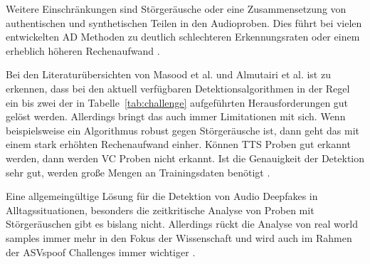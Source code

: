 Weitere Einschränkungen sind Störgeräusche oder eine Zusammensetzung von authentischen und synthetischen Teilen in den Audioproben.
Dies führt bei vielen entwickelten AD Methoden zu deutlich schlechteren Erkennungsraten oder einem erheblich höheren Rechenaufwand \citep[][]{Masood2022}.

Bei den Literaturübersichten von Masood et al. und Almutairi et al. ist zu erkennen, dass bei den aktuell verfügbaren Detektionsalgorithmen in der Regel ein bis zwei der in Tabelle~\ref{tab:challenge} aufgeführten Herausforderungen gut gelöst werden.
Allerdings bringt das auch immer Limitationen mit sich.
Wenn beispielsweise ein Algorithmus robust gegen Störgeräusche ist, dann geht das mit einem stark erhöhten Rechenaufwand einher.
Können TTS Proben gut erkannt werden, dann werden VC Proben nicht erkannt.
Ist die Genauigkeit der Detektion sehr gut, werden große Mengen an Trainingsdaten benötigt \citep[][]{Masood2022,Almutairi2022}.

Eine allgemeingültige Lösung für die Detektion von Audio Deepfakes in Alltagssituationen, besonders die zeitkritische Analyse von Proben mit Störgeräuschen gibt es bislang nicht.
Allerdings rückt die Analyse von \glqq{}real world samples\grqq{} immer mehr in den Fokus der Wissenschaft und wird auch im Rahmen der ASVspoof Challenges immer wichtiger \citep[][]{Yamagishi2021}.
